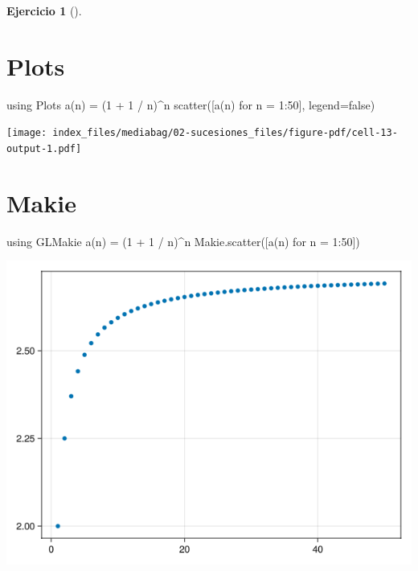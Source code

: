 \documentclass[
  a4paper,
]{scrreport}
\newenvironment{Shaded}{\begin{snugshade}}{\end{snugshade}}
\newcommand{\BuiltInTok}[1]{\textcolor[rgb]{0.00,0.23,0.31}{#1}}
\newcommand{\ConstantTok}[1]{\textcolor[rgb]{0.56,0.35,0.01}{#1}}
\newcommand{\FloatTok}[1]{\textcolor[rgb]{0.68,0.00,0.00}{#1}}
\newcommand{\FunctionTok}[1]{\textcolor[rgb]{0.28,0.35,0.67}{#1}}
\newcommand{\ImportTok}[1]{\textcolor[rgb]{0.00,0.46,0.62}{#1}}
\newcommand{\NormalTok}[1]{\textcolor[rgb]{0.00,0.23,0.31}{#1}}
\newcommand{\OperatorTok}[1]{\textcolor[rgb]{0.37,0.37,0.37}{#1}}
\theoremstyle{definition}
\newtheorem{exercise}{Ejercicio}[chapter]
\theoremstyle{remark}
\begin{document}
\begin{exercise}[]
\begin{enumerate}
\begin{tcolorbox}
  \section{Plots}

\begin{Shaded}
\begin{Highlighting}[]
\ImportTok{using} \BuiltInTok{Plots}
\FunctionTok{a}\NormalTok{(n) }\OperatorTok{=}\NormalTok{ (}\FloatTok{1} \OperatorTok{+} \FloatTok{1} \OperatorTok{/}\NormalTok{ n)}\OperatorTok{\^{}}\NormalTok{n}
\FunctionTok{scatter}\NormalTok{([}\FunctionTok{a}\NormalTok{(n) for n }\OperatorTok{=} \FloatTok{1}\OperatorTok{:}\FloatTok{50}\NormalTok{], legend}\OperatorTok{=}\ConstantTok{false}\NormalTok{)}
\end{Highlighting}
\end{Shaded}

  \texttt{[image: index\_files/mediabag/02-sucesiones\_files/figure-pdf/cell-13-output-1.pdf]}

  \section{Makie}

\begin{Shaded}
\begin{Highlighting}[]
\ImportTok{using} \BuiltInTok{GLMakie}
\FunctionTok{a}\NormalTok{(n) }\OperatorTok{=}\NormalTok{ (}\FloatTok{1} \OperatorTok{+} \FloatTok{1} \OperatorTok{/}\NormalTok{ n)}\OperatorTok{\^{}}\NormalTok{n}
\NormalTok{Makie.}\FunctionTok{scatter}\NormalTok{([}\FunctionTok{a}\NormalTok{(n) for n }\OperatorTok{=} \FloatTok{1}\OperatorTok{:}\FloatTok{50}\NormalTok{])}
\end{Highlighting}
\end{Shaded}

  \includegraphics{02-sucesiones_files/figure-pdf/cell-14-output-1.png}


\end{tcolorbox}
\end{enumerate}
\end{exercise}
\end{document}
